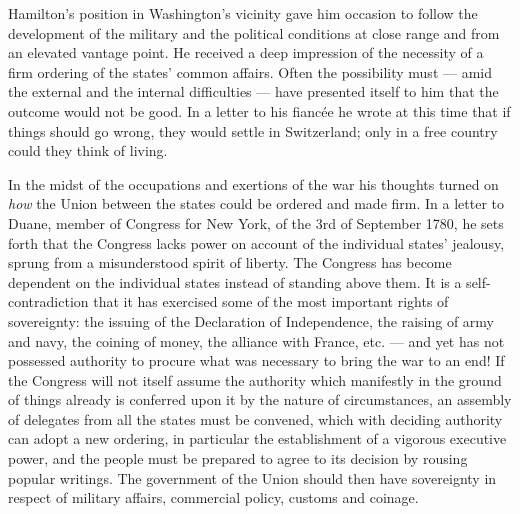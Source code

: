 \documentclass[12pt,a4paper,openany]{book}
\begin{document}
Hamilton's position in Washington's vicinity gave him
occasion to follow the development of the military and the political conditions
at close range and from an elevated vantage point. He received a
deep impression of the necessity of a firm ordering of the states'
common affairs. Often the possibility must --- amid the external and the
internal difficulties --- have presented itself to him
that the outcome would not be good. In a letter to his fiancée
he wrote at this time that if things should go wrong, they would
settle in Switzerland; only in a free country could they think of
living.

In the midst of the occupations and exertions of the war
his thoughts turned on \emph{how} the Union between the states could be
ordered and made firm. In a letter to Duane, member of
Congress for New York, of the 3rd of September 1780, he sets forth
that the Congress lacks power on account of the individual states'
jealousy, sprung from a misunderstood spirit of liberty. The Congress
has become dependent on the individual states instead of standing above
them. It is a self-contradiction that it has exercised some of
the most important rights of sovereignty: the issuing of
the Declaration of Independence, the raising of army and navy,
the coining of money, the alliance with France, etc. --- and yet
has not possessed authority to procure what was necessary
to bring the war to an end! If the Congress will not itself
assume the authority which manifestly in the ground of things already
is conferred upon it by the nature of circumstances, an
assembly of delegates from all the states must be convened, which
with deciding authority can adopt a new ordering,
in particular the establishment of a vigorous executive power, and the people
must be prepared to agree to its decision by rousing
popular writings. The government of the Union should then have
sovereignty in respect of military affairs, commercial policy, customs
and coinage.
\end{document}
